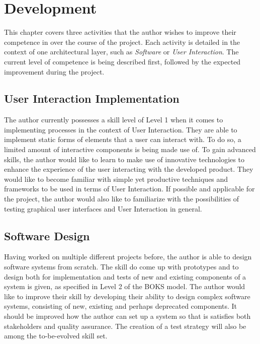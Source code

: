 \section{Development}
\label{sec:development}

This chapter covers three activities that the author wishes to improve their competence in over the course of the project. Each activity is detailed in the context of one architectural layer, such as \textit{Software} or \textit{User Interaction}. The current level of competence is being described first, followed by the expected improvement during the project.

\subsection{User Interaction Implementation}
\label{ssec:analysis}

The author currently possesses a skill level of Level 1 when it comes to implementing processes in the context of User Interaction. They are able to implement static forms of elements that a user can interact with. To do so, a limited amount of interactive components is being made use of.
\newline
To gain advanced skills, the author would like to learn to make use of innovative technologies to enhance the experience of the user interacting with the developed product. They would like to become familiar with simple yet productive techniques and frameworks to be used in terms of User Interaction. If possible and applicable for the project, the author would also like to familiarize with the possibilities of testing graphical user interfaces and User Interaction in general.

\subsection{Software Design}
\label{ssec:design}

Having worked on multiple different projects before, the author is able to design software systems from scratch. The skill do come up with prototypes and to design both for implementation and tests of new and existing components of a system is given, as specified in Level 2 of the BOKS model.
\newline
The author would like to improve their skill by developing their ability to design complex software systems, consisting of new, existing and perhaps deprecated components. It should be improved how the author can set up a system so that is satisfies both stakeholders and quality assurance. The creation of a test strategy will also be among the to-be-evolved skill set.

